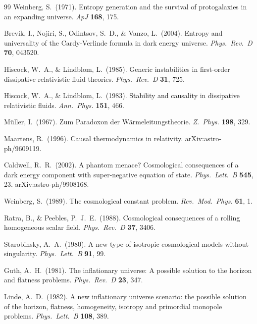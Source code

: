 \documentclass[12pt,a4paper]{article}
\begin{document}
\begin{thebibliography}{99}
Weinberg, S.\ (1971).
Entropy generation and the survival of protogalaxies in an expanding universe.
\textit{ApJ} \textbf{168}, 175.

Brevik, I., Nojiri, S., Odintsov, S.~D., \& Vanzo, L.\ (2004).
Entropy and universality of the Cardy-Verlinde formula in dark energy universe.
\textit{Phys.\ Rev.\ D} \textbf{70}, 043520.

Hiscock, W.~A., \& Lindblom, L.\ (1985).
Generic instabilities in first-order dissipative relativistic fluid theories.
\textit{Phys.\ Rev.\ D} \textbf{31}, 725.

Hiscock, W.~A., \& Lindblom, L.\ (1983).
Stability and causality in dissipative relativistic fluids.
\textit{Ann.\ Phys.} \textbf{151}, 466.

M{\"u}ller, I.\ (1967).
Zum Paradoxon der W{\"a}rmeleitungstheorie.
\textit{Z.\ Phys.} \textbf{198}, 329.

Maartens, R.\ (1996).
Causal thermodynamics in relativity.
arXiv:astro-ph/9609119.

Caldwell, R.~R.\ (2002).
A phantom menace? Cosmological consequences of a dark energy component with super-negative equation of state.
\textit{Phys.\ Lett.\ B} \textbf{545}, 23. arXiv:astro-ph/9908168.

Weinberg, S.\ (1989).
The cosmological constant problem.
\textit{Rev.\ Mod.\ Phys.} \textbf{61}, 1.

Ratra, B., \& Peebles, P.~J.~E.\ (1988).
Cosmological consequences of a rolling homogeneous scalar field.
\textit{Phys.\ Rev.\ D} \textbf{37}, 3406.

Starobinsky, A.~A.\ (1980).
A new type of isotropic cosmological models without singularity.
\textit{Phys.\ Lett.\ B} \textbf{91}, 99.

Guth, A.~H.\ (1981).
The inflationary universe: A possible solution to the horizon and flatness problems.
\textit{Phys.\ Rev.\ D} \textbf{23}, 347.

Linde, A.~D.\ (1982).
A new inflationary universe scenario: the possible solution of the horizon, flatness,
homogeneity, isotropy and primordial monopole problems.
\textit{Phys.\ Lett.\ B} \textbf{108}, 389.


\end{thebibliography}
\end{document}
